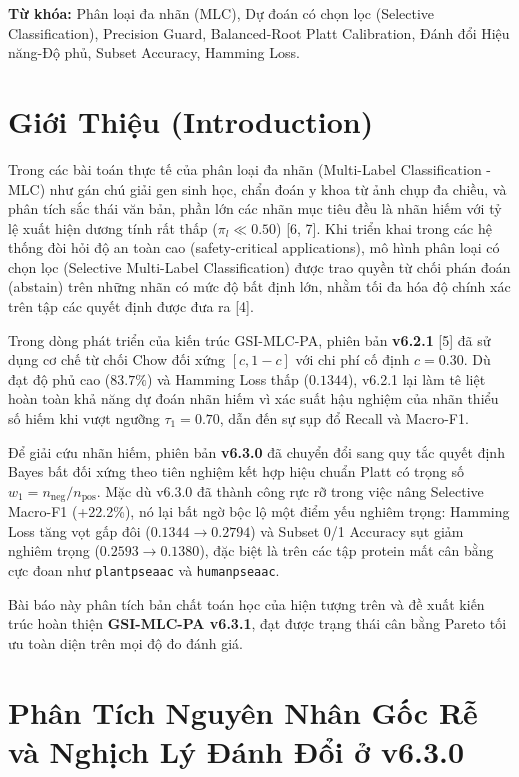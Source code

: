\documentclass[10pt,a4paper,twoside]{article}
\begin{document}
\vspace{0.5em}
\noindent\textbf{Từ khóa:} Phân loại đa nhãn (MLC), Dự đoán có chọn lọc (Selective Classification), Precision Guard, Balanced-Root Platt Calibration, Đánh đổi Hiệu năng-Độ phủ, Subset Accuracy, Hamming Loss.

\section{Giới Thiệu (Introduction)}
Trong các bài toán thực tế của phân loại đa nhãn (Multi-Label Classification - MLC) như gán chú giải gen sinh học, chẩn đoán y khoa từ ảnh chụp đa chiều, và phân tích sắc thái văn bản, phần lớn các nhãn mục tiêu đều là nhãn hiếm với tỷ lệ xuất hiện dương tính rất thấp ($\pi_l \ll 0.50$) [6, 7]. Khi triển khai trong các hệ thống đòi hỏi độ an toàn cao (safety-critical applications), mô hình phân loại có chọn lọc (Selective Multi-Label Classification) được trao quyền từ chối phán đoán (abstain) trên những nhãn có mức độ bất định lớn, nhằm tối đa hóa độ chính xác trên tập các quyết định được đưa ra [4].

Trong dòng phát triển của kiến trúc GSI-MLC-PA, phiên bản \textbf{v6.2.1} [5] đã sử dụng cơ chế từ chối Chow đối xứng $[c, 1-c]$ với chi phí cố định $c = 0.30$. Dù đạt độ phủ cao ($83.7\%$) và Hamming Loss thấp ($0.1344$), v6.2.1 lại làm tê liệt hoàn toàn khả năng dự đoán nhãn hiếm vì xác suất hậu nghiệm của nhãn thiểu số hiếm khi vượt ngưỡng $\tau_1 = 0.70$, dẫn đến sự sụp đổ Recall và Macro-F1.

Để giải cứu nhãn hiếm, phiên bản \textbf{v6.3.0} đã chuyển đổi sang quy tắc quyết định Bayes bất đối xứng theo tiên nghiệm kết hợp hiệu chuẩn Platt có trọng số $w_1 = n_{\text{neg}}/n_{\text{pos}}$. Mặc dù v6.3.0 đã thành công rực rỡ trong việc nâng Selective Macro-F1 (+22.2\%), nó lại bất ngờ bộc lộ một điểm yếu nghiêm trọng: Hamming Loss tăng vọt gấp đôi ($0.1344 \to 0.2794$) và Subset 0/1 Accuracy sụt giảm nghiêm trọng ($0.2593 \to 0.1380$), đặc biệt là trên các tập protein mất cân bằng cực đoan như \texttt{plantpseaac} và \texttt{humanpseaac}.

Bài báo này phân tích bản chất toán học của hiện tượng trên và đề xuất kiến trúc hoàn thiện \textbf{GSI-MLC-PA v6.3.1}, đạt được trạng thái cân bằng Pareto tối ưu toàn diện trên mọi độ đo đánh giá.
\section{Phân Tích Nguyên Nhân Gốc Rễ và Nghịch Lý Đánh Đổi ở v6.3.0}
\end{document}
